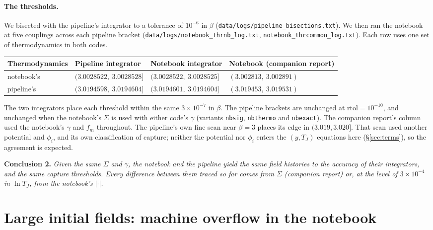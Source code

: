 \documentclass[11pt,a4paper]{article}
\newcommand{\TJ}{T_{J}}
\newcommand{\code}[1]{\texttt{#1}}
\begin{document}
\paragraph{The thresholds.} We bisected with the pipeline's integrator to a tolerance of
$10^{-6}$ in $\beta$ (\code{data/logs/pipeline\_bisections.txt}). We then ran the notebook at
five couplings across each pipeline bracket (\code{data/logs/notebook\_thrnb\_log.txt},
\code{notebook\_thrcommon\_log.txt}). Each row uses one set of thermodynamics in both codes.
\begin{center}\small
\begin{tabular}{@{}llll@{}}
\toprule
Thermodynamics & Pipeline integrator & Notebook integrator & Notebook (companion report) \\
\midrule
notebook's & $(3.0028522,\ 3.0028528]$ & $(3.0028522,\ 3.0028525]$ & $(3.002813,\ 3.002891)$ \\
pipeline's & $(3.0194598,\ 3.0194604]$ & $(3.0194601,\ 3.0194604]$ & $(3.019453,\ 3.019531)$ \\
\bottomrule
\end{tabular}
\end{center}
The two integrators place each threshold within the same $3\times10^{-7}$ in $\beta$. The
pipeline brackets are unchanged at $\mathrm{rtol} = 10^{-10}$, and unchanged when the
notebook's $\Sigma$ is used with either code's $\gamma$ (variants \code{nbsig},
\code{nbthermo} and \code{nbexact}). The companion report's column used the notebook's
$\gamma$ and $f_m$ throughout. The pipeline's own fine scan near $\beta = 3$ places its edge
in $(3.019, 3.020]$. That scan used another potential and $\phi_i$, and its own classification
of capture; neither the potential nor $\phi_i$ enters the $(y, \TJ)$ equations here
(\S\ref{sec:terms}), so the agreement is expected.

\medskip\noindent
\textbf{Conclusion 2.} \emph{Given the same $\Sigma$ and $\gamma$, the notebook and the
pipeline yield the same field histories to the accuracy of their integrators, and the same
capture thresholds. Every difference between them traced so far comes from $\Sigma$
(companion report) or, at the level of $3\times10^{-4}$ in $\ln\TJ$, from the notebook's
$|\cdot|$.}

\section{Large initial fields: machine overflow in the notebook}
\label{sec:overflow}
\end{document}
